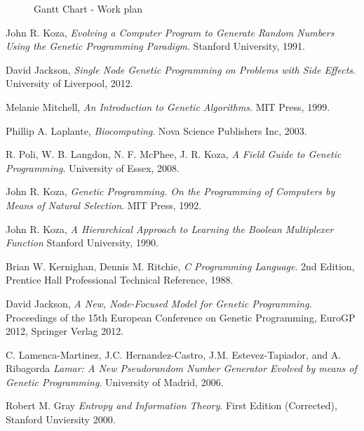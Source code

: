 \documentclass[a4paper,10.5pt]{article}
\begin{document}
\begin{sidewaysfigure}
\begin{ganttchart}

\end{ganttchart}
\caption{Gantt Chart - Work plan}
\label{fig:ganttchart}
\end{sidewaysfigure}

\newpage 

\begin{thebibliography}{10}

  John R. Koza, 
  \emph{Evolving a Computer Program to Generate Random Numbers Using the Genetic Programming Paradigm}. 
  Stanford University, 
  1991.

  David Jackson,
  \emph{Single Node Genetic Programming on Problems with Side Effects}.
  University of Liverpool,
  2012.

  Melanie Mitchell,
  \emph{An Introduction to Genetic Algorithms}.
  MIT Press,
  1999.

  Phillip A. Laplante,
  \emph{Biocomputing}.
  Nova Science Publishers Inc,
  2003.

  R. Poli, W. B. Langdon, N. F. McPhee, J. R. Koza, 
  \emph{A Field Guide to Genetic Programming}. 
  University of Essex, 
  2008.

  John R. Koza, 
  \emph{Genetic Programming. On the Programming of Computers by Means of Natural Selection}. 
  MIT Press, 
  1992.

  John R. Koza,
  \emph{A Hierarchical Approach to Learning the Boolean Multiplexer Function}
  Stanford University,
  1990.

  Brian W. Kernighan, Dennis M. Ritchie, 
  \emph{C Programming Language}.
  2nd Edition, 
  Prentice Hall Professional Technical Reference, 
  1988.

  David Jackson,
  \emph{A New, Node-Focused Model for Genetic Programming}.
  Proceedings of the 15th European Conference on Genetic Programming, EuroGP 2012, 
  Springer Verlag
  2012.

  C. Lamenca-Martinez, J.C. Hernandez-Castro,
  J.M. Estevez-Tapiador, and A. Ribagorda
  \emph{Lamar: A New Pseudorandom Number Generator Evolved by means of Genetic Programming}.
  University of Madrid,
  2006.

  Robert M. Gray
  \emph{Entropy and Information Theory}.
  First Edition (Corrected),
  Stanford Unviersity
  2000.

\end{thebibliography}
\end{document}
